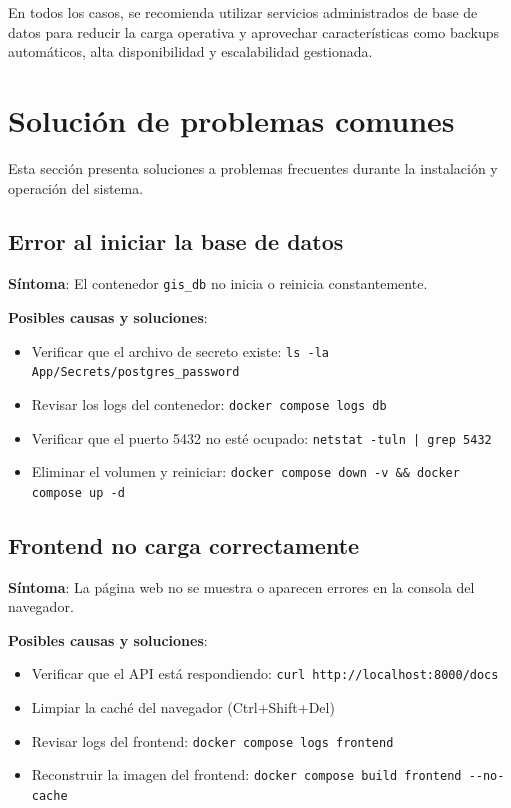En todos los casos, se recomienda utilizar servicios administrados de base de datos para reducir la carga operativa y aprovechar características como backups automáticos, alta disponibilidad y escalabilidad gestionada.

\section{Solución de problemas comunes}
\label{sec:chp7-8}

Esta sección presenta soluciones a problemas frecuentes durante la instalación y operación del sistema.

\subsection{Error al iniciar la base de datos}
\label{subsec:chp7-8-1}

\textbf{Síntoma}: El contenedor \lstinline[style=bash]|gis_db| no inicia o reinicia constantemente.

\textbf{Posibles causas y soluciones}:

\begin{itemize}
    \item Verificar que el archivo de secreto existe: \lstinline[style=bash]|ls -la App/Secrets/postgres_password|
    \item Revisar los logs del contenedor: \lstinline[style=bash]|docker compose logs db|
    \item Verificar que el puerto 5432 no esté ocupado: \lstinline[style=bash]$netstat -tuln | grep 5432$
    \item Eliminar el volumen y reiniciar: \lstinline[style=bash]|docker compose down -v && docker compose up -d|
\end{itemize}

\subsection{Frontend no carga correctamente}
\label{subsec:chp7-8-2}

\textbf{Síntoma}: La página web no se muestra o aparecen errores en la consola del navegador.

\textbf{Posibles causas y soluciones}:

\begin{itemize}
    \item Verificar que el API está respondiendo: \lstinline[style=bash]|curl http://localhost:8000/docs|
    \item Limpiar la caché del navegador (Ctrl+Shift+Del)
    \item Revisar logs del frontend: \lstinline[style=bash]|docker compose logs frontend|
    \item Reconstruir la imagen del frontend: \lstinline[style=bash]|docker compose build frontend --no-cache|
\end{itemize}

